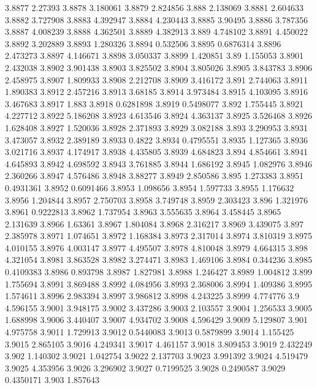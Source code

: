 3.8877  2.27393
3.8878  3.180061
3.8879  2.824856
3.888  2.138069
3.8881  2.604633
3.8882  3.727908
3.8883  4.392947
3.8884  4.230443
3.8885  3.90495
3.8886  3.787356
3.8887  4.008239
3.8888  4.362501
3.8889  4.382913
3.889  4.748102
3.8891  4.450022
3.8892  3.202889
3.8893  1.280326
3.8894  0.532506
3.8895  0.6876314
3.8896  2.473273
3.8897  4.146671
3.8898  3.050337
3.8899  1.420851
3.89  1.155053
3.8901  2.432038
3.8902  3.901438
3.8903  3.825502
3.8904  3.805026
3.8905  3.843783
3.8906  2.458975
3.8907  1.809933
3.8908  2.212708
3.8909  3.416172
3.891  2.744063
3.8911  1.890383
3.8912  2.457216
3.8913  3.68185
3.8914  3.973484
3.8915  4.103095
3.8916  3.467683
3.8917  1.883
3.8918  0.6281898
3.8919  0.5498077
3.892  1.755445
3.8921  4.227712
3.8922  5.186208
3.8923  4.613546
3.8924  4.363137
3.8925  3.526468
3.8926  1.628408
3.8927  1.520036
3.8928  2.371893
3.8929  3.082188
3.893  3.290953
3.8931  3.473057
3.8932  2.389189
3.8933  0.4822
3.8934  0.4795551
3.8935  1.127365
3.8936  3.021716
3.8937  4.174917
3.8938  4.435805
3.8939  4.684823
3.894  4.854661
3.8941  4.645893
3.8942  4.698592
3.8943  3.761885
3.8944  1.686192
3.8945  1.082976
3.8946  2.360266
3.8947  4.576486
3.8948  3.88277
3.8949  2.850586
3.895  1.273383
3.8951  0.4931361
3.8952  0.6091466
3.8953  1.098656
3.8954  1.597733
3.8955  1.176632
3.8956  1.204844
3.8957  2.750703
3.8958  3.749748
3.8959  2.303423
3.896  1.321976
3.8961  0.9222813
3.8962  1.737954
3.8963  3.555635
3.8964  3.458445
3.8965  2.131639
3.8966  1.63361
3.8967  1.804084
3.8968  2.316217
3.8969  3.439075
3.897  2.385978
3.8971  1.074651
3.8972  1.168384
3.8973  2.317014
3.8974  3.810319
3.8975  4.010155
3.8976  4.003147
3.8977  4.495507
3.8978  4.810048
3.8979  4.664315
3.898  4.321054
3.8981  3.863528
3.8982  3.274471
3.8983  1.469106
3.8984  0.344236
3.8985  0.4109383
3.8986  0.893798
3.8987  1.827981
3.8988  1.246427
3.8989  1.004812
3.899  1.755694
3.8991  3.869488
3.8992  4.084956
3.8993  2.368006
3.8994  1.409386
3.8995  1.574611
3.8996  2.983394
3.8997  3.986812
3.8998  4.243225
3.8999  4.774776
3.9  4.596155
3.9001  3.948175
3.9002  3.437286
3.9003  2.103557
3.9004  1.256533
3.9005  1.688998
3.9006  3.440407
3.9007  4.934702
3.9008  4.596429
3.9009  5.129807
3.901  4.975758
3.9011  1.729913
3.9012  0.5440083
3.9013  0.5879899
3.9014  1.155425
3.9015  2.865105
3.9016  4.249341
3.9017  4.461157
3.9018  3.809453
3.9019  2.432249
3.902  1.140302
3.9021  1.042754
3.9022  2.137703
3.9023  3.991392
3.9024  4.519479
3.9025  4.353956
3.9026  3.296902
3.9027  0.7199525
3.9028  0.2490587
3.9029  0.4350171
3.903  1.857643
